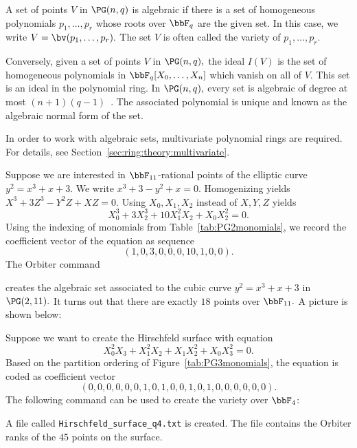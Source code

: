 A set of points $V$ in $\PG(n,q)$ is algebraic if there is a set 
of homogeneous polynomials $p_1,\ldots,p_r$
whose roots over $\bbF_q$ are the given set. 
In this case, we write $V = \bv(p_1,\ldots,p_r).$ 
The set $V$ is often called the variety of $p_1,\ldots,p_r.$

\bigskip

Conversely, given a set of points $V$ in $\PG(n,q),$ 
the ideal $I(V)$ is the set of homogeneous polynomials 
in $\bbF_q[X_0,\ldots,X_n]$ which vanish on all of $V.$
This set is an ideal in the polynomial ring. 
In $\PG(n,q),$ every set is algebraic 
of degree at most $(n+1)(q-1)$~\cite{GlynnHirschfeld95}. 
The associated polynomial is unique and known as 
the algebraic normal form of the set.


\bigskip


In order to work with algebraic sets, multivariate polynomial rings are required. 
For details, see Section~\ref{sec:ring:theory:multivariate}.

\bigskip


Suppose we are interested in $\bbF_{11}$-rational points of 
the elliptic curve $y^2= x^3+x+3.$
We write $x^3+3-y^2+x = 0.$ 
Homogenizing yields $X^3+3Z^3-Y^2Z+XZ = 0.$
Using $X_0,X_1,X_2$ instead of $X,Y,Z$ yields
$$
X_0^3+3X_2^3 + 10X_1^2X_2  + X_0X_2^2 = 0.
$$
Using the indexing of monomials from 
Table~\ref{tab:PG2monomials}, 
we record the coefficient vector of the equation as sequence
$$
(1,0,3,0,0,0,10,1,0,0).
$$
The Orbiter command




creates the algebraic set associated to the cubic curve $y^2=x^3+x+3$ in $\PG(2,11).$ 
It turns out that there are exactly $18$ 
points over $\bbF_{11}.$ A picture is shown below:


Suppose we want to create the Hirschfeld surface with equation
$$
X_0^2X_3 + X_1^2X_2 + X_1X_2^2 + X_0X_3^2=0.
$$  
Based on the partition ordering 
of Figure~\ref{tab:PG3monomials}, 
the equation is coded as coefficient vector
$$
(0,0,0,0,0,0,1,0,1,0, 0,1,0,1,0,0,0,0,0,0).
$$
The following command can be used to create the variety over $\bbF_4$:




A file called \verb'Hirschfeld_surface_q4.txt' is created. 
The file contains the Orbiter 
ranks of the $45$ points on the surface.


\bigskip

